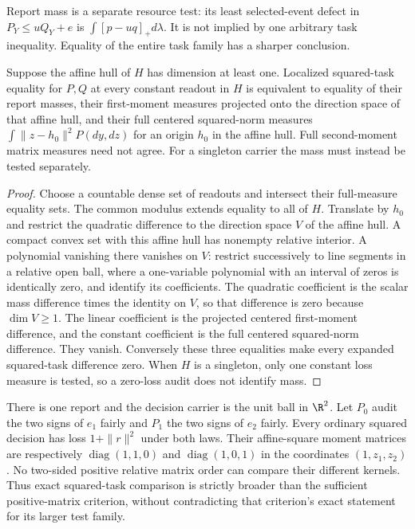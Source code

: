 Report mass is a separate resource test: its least selected-event defect in $P_Y\le uQ_Y+e$ is $\int[p-uq]_+d\lambda$. It is not implied by one arbitrary task inequality. Equality of the entire task family has a sharper conclusion.

\begin{proposition}\label{prop:task-rigidity}
Suppose the affine hull of $H$ has dimension at least one. Localized squared-task equality for $P,Q$ at every constant readout in $H$ is equivalent to equality of their report masses, their first-moment measures projected onto the direction space of that affine hull, and their full centered squared-norm measures $\int\|z-h_0\|^2P(dy,dz)$ for an origin $h_0$ in the affine hull. Full second-moment matrix measures need not agree. For a singleton carrier the mass must instead be tested separately.
\end{proposition}
\begin{proof}
Choose a countable dense set of readouts and intersect their full-measure equality sets. The common modulus extends equality to all of $H$. Translate by $h_0$ and restrict the quadratic difference to the direction space $V$ of the affine hull. A compact convex set with this affine hull has nonempty relative interior. A polynomial vanishing there vanishes on $V$: restrict successively to line segments in a relative open ball, where a one-variable polynomial with an interval of zeros is identically zero, and identify its coefficients. The quadratic coefficient is the scalar mass difference times the identity on $V$, so that difference is zero because $\dim V\ge1$. The linear coefficient is the projected centered first-moment difference, and the constant coefficient is the full centered squared-norm difference. They vanish. Conversely these three equalities make every expanded squared-task difference zero. When $H$ is a singleton, only one constant loss measure is tested, so a zero-loss audit does not identify mass.
\end{proof}

\begin{example}\label{ex:strict-task-order}
There is one report and the decision carrier is the unit ball in $\R^2$. Let $P_0$ audit the two signs of $e_1$ fairly and $P_1$ the two signs of $e_2$ fairly. Every ordinary squared decision has loss $1+\|r\|^2$ under both laws. Their affine-square moment matrices are respectively $\operatorname{diag}(1,1,0)$ and $\operatorname{diag}(1,0,1)$ in the coordinates $(1,z_1,z_2)$. No two-sided positive relative matrix order can compare their different kernels. Thus exact squared-task comparison is strictly broader than the sufficient positive-matrix criterion, without contradicting that criterion's exact statement for its larger test family.
\end{example}

